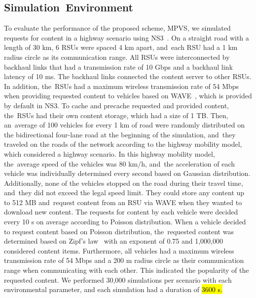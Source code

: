 \documentclass[sensors,aricle,accept,pdftex,moreauthors]{Definitions/mdpi}
\begin{document}
\subsection{Simulation~Environment} \label{sec5.1}
To evaluate the performance of the proposed scheme, MPVS, we simulated requests for content in a highway scenario using NS3~\cite{NS3}.
On a straight road with a length of 30 km, 6 RSUs were spaced 4 km apart, and~each RSU had a 1 km radius circle as its communication range.
All RSUs were interconnected by backhaul links that had a transmission rate of 10 Gbps and a backhaul link latency of 10 ms.
The backhaul links connected the content server to other RSUs.
In addition, the~RSUs had a maximum wireless transmission rate of 54 Mbps when providing requested content to vehicles based on WAVE~\cite{WAVE}, which is provided by default in NS3.
To cache and precache requested and provided content, the~RSUs had their own content storage, which had a size of 1 TB.
Then, an~average of 100 vehicles for every 1 km of road were randomly distributed on the bidirectional four-lane road at the beginning of the simulation, and~they traveled on the roads of the network according to the highway mobility model, which considered a highway scenario.
In this highway mobility model, the~average speed of the vehicles was 80 km/h, and~the acceleration of each vehicle was individually determined every second based on Gaussian distribution.
Additionally, none of the vehicles stopped on the road during their travel time, and~they did not exceed the legal speed limit.
They could store any content up to 512 MB and~request content from an RSU via WAVE when they wanted to download new content.
The requests for content by each vehicle were decided every 10 s on average according to Poisson distribution.
When a vehicle decided to request content based on Poisson distribution, the~requested content was determined based on Zipf's law~\cite{Zipf} with an exponent of 0.75 and 1,000,000 considered content items.
Furthermore, all vehicles had a maximum wireless transmission rate of 54 Mbps and a 200 m radius circle as their communication range when communicating with each other.
This indicated the popularity of the requested content.
We performed 30,000 simulations per scenario with each environmental parameter, and each simulation had a duration of \hl{3600 s.}

\end{document}
